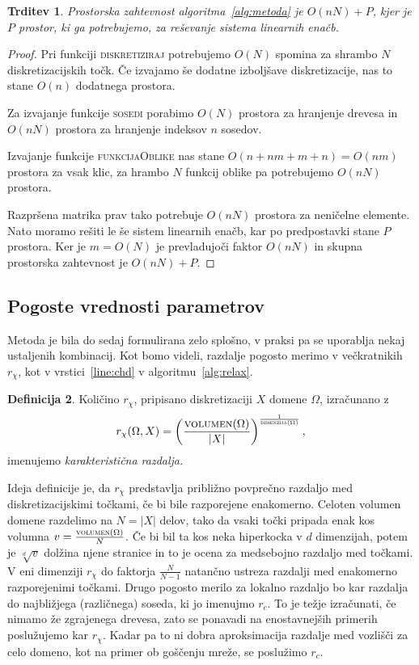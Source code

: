 \documentclass[12pt,a4paper,twoside]{article}
\theoremstyle{definition} %
\newtheorem{definicija}{Definicija}[section]
\theoremstyle{plain} %
\newtheorem{trditev}[definicija]{Trditev}
\numberwithin{equation}{section}
\begin{document}
\begin{trditev}
  Prostorska zahtevnost algoritma~\ref{alg:metoda} je $O(nN) + P$, kjer je $P$
  prostor, ki ga potrebujemo, za reševanje sistema linearnih enačb.
\end{trditev}
\begin{proof}
Pri funkciji \textsc{diskretiziraj} potrebujemo $O(N)$ spomina za shrambo $N$
diskretizacijskih točk. Če izvajamo še dodatne izboljšave diskretizacije, nas to
stane $O(n)$ dodatnega prostora.

Za izvajanje funkcije \textsc{sosedi} porabimo $O(N)$ prostora za hranjenje drevesa
in $O(nN)$ prostora za hranjenje indeksov $n$ sosedov.

Izvajanje funkcije \textsc{funkcijaOblike} nas stane $O(n+nm+m+n) = O(nm)$
prostora za vsak klic, za hrambo $N$ funkcij oblike pa potrebujemo $O(nN)$
prostora.

Razpršena matrika prav tako potrebuje $O(nN)$ prostora za neničelne elemente.
Nato moramo rešiti le še sistem linearnih enačb, kar po predpostavki stane $P$
prostora. Ker je $m = O(N)$ je prevladujoči faktor $O(nN)$ in skupna prostorska
zahtevnost je $O(nN) + P$.
\end{proof}

\subsection{Pogoste vrednosti parametrov}
Metoda je bila do sedaj formulirana zelo splošno, v praksi pa se uporablja nekaj
ustaljenih kombinacij. Kot bomo videli, razdalje pogosto merimo v večkratnikih
$r_\chi$, kot v vrstici~\ref{line:chd} v algoritmu~\ref{alg:relax}.
\begin{definicija}
  Količino $r_\chi$, pripisano diskretizaciji $X$ domene $\Omega$, izračunano z \[
    r_\chi(\Omega, X) = \left( \frac{\textsc{volumen}(\Omega)}{|X|}
    \right)^\frac{1}{\textsc{dimenzija}(\Omega)},
  \]
  imenujemo \emph{karakteristična razdalja.}
\end{definicija}
Ideja definicije je, da $r_\chi$ predstavlja približno povprečno razdaljo med
diskretizacijskimi točkami, če bi bile razporejene enakomerno. Celoten volumen
domene razdelimo na $N = |X|$ delov, tako da vsaki točki pripada enak kos
volumna $v = \frac{\textsc{volumen}(\Omega)}{N}$. Če bi
bil ta kos neka hiperkocka v $d$ dimenzijah, potem je $\sqrt[d]{v}$ dolžina
njene stranice in to je ocena za medsebojno razdaljo med točkami.
V eni dimenziji $r_\chi$ do faktorja $\frac{N}{N-1}$ natančno ustreza razdalji
med enakomerno razporejenimi točkami.
Drugo pogosto merilo za lokalno razdaljo bo kar razdalja do najbližjega
(različnega) soseda, ki jo imenujmo $r_c$. To je težje izračunati, če nimamo že
zgrajenega drevesa, zato se ponavadi na enostavnejših primerih poslužujemo kar
$r_\chi$. Kadar pa to ni dobra aproksimacija razdalje med vozlišči za celo
domeno, kot na primer ob goščenju mreže, se poslužimo $r_c$.
\end{document}
